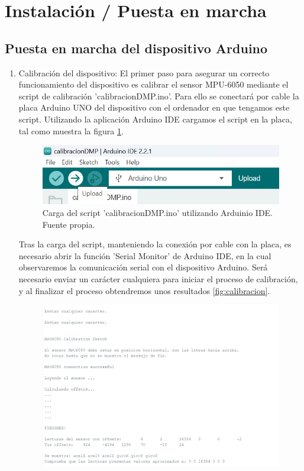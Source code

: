 \section{Instalación / Puesta en marcha}
\subsection{Puesta en marcha del dispositivo Arduino}
\begin{enumerate}
    \item Calibración del dispositivo: El primer paso para asegurar un correcto funcionamiento del dispositivo es calibrar el sensor MPU-6050 mediante el script de calibración 'calibracionDMP.ino'. Para ello se conectará por cable la placa Arduino UNO del dispositivo con el ordenador en que tengamos este script. Utilizando la aplicación Arduino IDE cargamos el script en la placa, tal como muestra la figura \ref{fig:cargascript}.
    \begin{figure}[h]
        \centering
        \includegraphics[width=1\textwidth]{img/cargascript.png}
        \caption{Carga del script 'calibracionDMP.ino' utilizando Arduinio IDE. Fuente propia.}
        \label{fig:cargascript}
    \end{figure}
    Tras la carga del script, manteniendo la conexión por cable con la placa, es necesario abrir la función 'Serial Monitor' de Arduino IDE, en la cual observaremos la comunicación serial con el dispositivo Arduino. Será necesario enviar un carácter cualquiera para iniciar el proceso de calibración, y al finalizar el proceso obtendremos unos resultados \ref{fig:calibracion}.
    \begin{figure}[h]
        \centering
        \includegraphics[width=1\textwidth]{img/calibracion.png}

\end{figure}
\end{enumerate}
